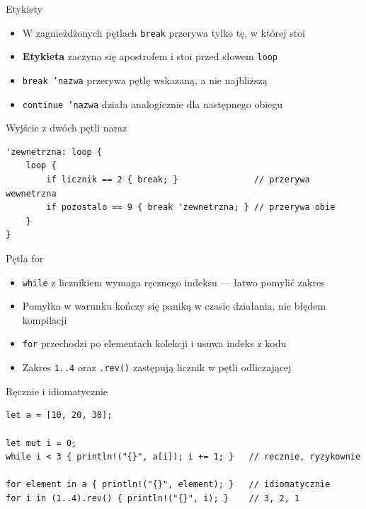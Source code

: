 \begin{frame}[fragile]{Etykiety}
  \begin{itemize}
    \item W zagnieżdżonych pętlach \texttt{break} przerywa tylko tę, w której stoi
    \item \textbf{Etykieta} zaczyna się apostrofem i stoi przed słowem \texttt{loop}
    \item \texttt{break 'nazwa} przerywa pętlę wskazaną, a nie najbliższą
    \item \texttt{continue 'nazwa} działa analogicznie dla następnego obiegu
  \end{itemize}
  \begin{block}{Wyjście z dwóch pętli naraz}
\begin{lstlisting}
'zewnetrzna: loop {
    loop {
        if licznik == 2 { break; }               // przerywa wewnetrzna
        if pozostalo == 9 { break 'zewnetrzna; } // przerywa obie
    }
}
\end{lstlisting}
  \end{block}
\end{frame}

\begin{frame}[fragile]{Pętla for}
  \begin{itemize}
    \item \texttt{while} z licznikiem wymaga ręcznego indeksu --- łatwo pomylić zakres
    \item Pomyłka w warunku kończy się paniką w czasie działania, nie błędem kompilacji
    \item \texttt{for} przechodzi po elementach kolekcji i usuwa indeks z kodu
    \item Zakres \texttt{1..4} oraz \texttt{.rev()} zastępują licznik w pętli odliczającej
  \end{itemize}
  \begin{block}{Ręcznie i idiomatycznie}
\begin{lstlisting}
let a = [10, 20, 30];

let mut i = 0;
while i < 3 { println!("{}", a[i]); i += 1; }   // recznie, ryzykownie

for element in a { println!("{}", element); }   // idiomatycznie
for i in (1..4).rev() { println!("{}", i); }    // 3, 2, 1
\end{lstlisting}
  \end{block}
\end{frame}

